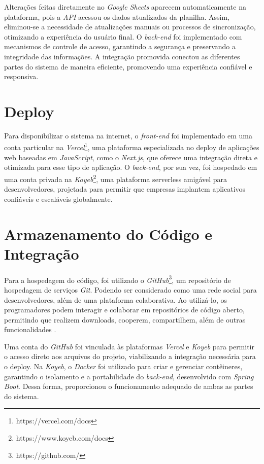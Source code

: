 Alterações feitas diretamente no \textit{Google Sheets} aparecem automaticamente na plataforma, pois a \textit{API} acessou os dados atualizados da planilha. Assim, eliminou-se a necessidade de atualizações manuais ou processos de sincronização, otimizando a experiência do usuário final. O \textit{back-end} foi implementado com mecanismos de controle de acesso, garantindo a segurança e preservando a integridade das informações. A integração promovida conectou as diferentes partes do sistema de maneira eficiente, promovendo uma experiência confiável e responsiva.

\section{Deploy}

Para disponibilizar o sistema na internet, o \textit{front-end} foi implementado em uma conta particular na \textit{Vercel}\footnote{https://vercel.com/docs}, uma plataforma especializada no deploy de aplicações web baseadas em \textit{JavaScript}, como o \textit{Next.js}, que oferece uma integração direta e otimizada para esse tipo de aplicação. O \textit{back-end}, por sua vez, foi hospedado em uma conta privada na \textit{Koyeb}\footnote{https://www.koyeb.com/docs}, uma plataforma serverless amigável para desenvolvedores, projetada para permitir que empresas implantem aplicativos confiáveis e escaláveis globalmente.

\section{Armazenamento do Código e Integração}

Para a hospedagem do código, foi utilizado o \textit{GitHub}\footnote{https://github.com/}, um repositório de hospedagem de serviços \textit{Git}. Podendo ser considerado como uma rede social para desenvolvedores, além de uma plataforma colaborativa. Ao utilizá-lo, os programadores podem interagir e colaborar em repositórios de código aberto, permitindo que realizem downloads, cooperem, compartilhem, além de outras funcionalidades \cite{silva2024biblioteca}.

Uma conta do \textit{GitHub} foi vinculada às plataformas \textit{Vercel} e \textit{Koyeb} para permitir o acesso direto aos arquivos do projeto, viabilizando a integração necessária para o deploy. Na \textit{Koyeb}, o \textit{Docker} foi utilizado para criar e gerenciar contêineres, garantindo o isolamento e a portabilidade do \textit{back-end}, desenvolvido com \textit{Spring Boot}. Dessa forma, proporcionou o funcionamento adequado de ambas as partes do sistema.

